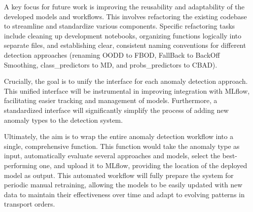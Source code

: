 A key focus for future work is improving the reusability and adaptability of the developed models and workflows. This involves refactoring the existing codebase to streamline and standardize various components. Specific refactoring tasks include cleaning up development notebooks, organizing functions logically into separate files, and establishing clear, consistent naming conventions for different detection approaches (renaming OODD to FBOD, FallBack to BackOff Smoothing, class_predictors to MD, and probs_predictors to CBAD).

Crucially, the goal is to unify the interface for each anomaly detection approach. This unified interface will be instrumental in improving integration with MLflow, facilitating easier tracking and management of models. Furthermore, a standardized interface will significantly simplify the process of adding new anomaly types to the detection system.

Ultimately, the aim is to wrap the entire anomaly detection workflow into a single, comprehensive function. This function would take the anomaly type as input, automatically evaluate several approaches and models, select the best-performing one, and upload it to MLflow, providing the location of the deployed model as output. This automated workflow will fully prepare the system for periodic manual retraining, allowing the models to be easily updated with new data to maintain their effectiveness over time and adapt to evolving patterns in transport orders.
